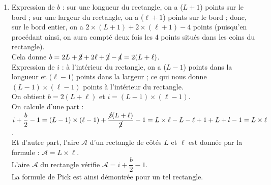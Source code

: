 {\begin{corrige}
\begin{enumerate}
        pour le polygone $DEF$, on trouve $i =6$ et $b=15$ donc $\mathcal{A}_2 =6+\dfrac{15}{2}-1 =\dfrac{25}{2}$. \\ [1mm]
      $\mathcal{A}_1+\mathcal{A}_2 =35+\dfrac{25}{2} =\dfrac{95}{2}.$ \\ [1mm]
      {\blue La somme des résultats obtenus est égale au résultat trouvé à la question 1).}
   \item Expression de $b$ : sur une longueur du rectangle, on a ($L+1$) points sur le bord ; sur une largeur du rectangle, on a ($\ell+1$) points sur le bord ; donc, sur le bord entier, on a $2\times(L+1)+2\times(\ell+1)-4$ points (puisqu'en procédant ainsi, on aura compté deux fois les 4 points situés dans les coins du rectangle). \\
      Cela donne $b =2L+\cancel{2}+2\ell+\cancel{2}-\cancel{4}=2(L+\ell)$. \\ 
      Expression de $i$ : à l'intérieur du rectangle, on a ($L-1$) points dans la longueur et ($\ell-1$) points dans la largeur ; ce qui nous donne $(L-1)\times(\ell-1)$ points à l'intérieur du rectangle. \\
      {\blue On obtient $b =2(L+\ell)$ et $i =(L-1)\times(\ell-1)$.} \\
      On calcule d'une part : $i+\dfrac{b}{2}-1 =(L-1)\times(\ell-1)+\dfrac{\cancel{2}(L+\ell)}{\cancel{2}}-1 =L\times\ell-L-\ell+1+L+l-1 =L\times\ell$. \\ [1mm]
      Et d'autre part, l'aire $\mathcal{A}$ d'un rectangle de côtés $L$ et $\ell$ est donnée par la formule : $\mathcal{A} =L\times\ell$. \\
      {\blue L'aire $\mathcal{A}$ du rectangle vérifie $\mathcal{A} =i+\dfrac{b}{2}-1$.} \\
      La formule de Pick est ainsi démontrée pour un tel rectangle.
   \end{enumerate}
\end{corrige}

\bigskip


}
